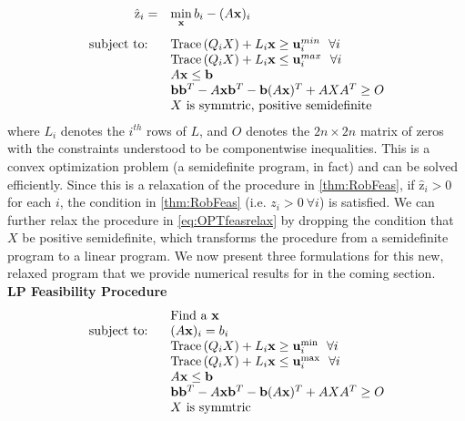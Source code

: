 \begin{equation}\label{eq:OPTfeasrelax}
  \begin{array}{rl}
    \hat{\mathrm{z}}_{i} = & \min\limits_{\vx}  b_i-(A\vx)_i  \\
    \vspace*{-0.05in} \\
    \text{subject to: } \ & \Tr\left(Q_iX\right)+ L_i\vx \geq \vu_i^{min} \ \ \forall i\\
    & \Tr\left(Q_iX\right)+ L_i\vx \leq \vu_i^{max} \ \ \forall i\\
    &A\vx\leq \vb \\
    &\vb\vb^T-A\vx\vb^T-\vb(A\vx)^T+AXA^T\geq O \\
    &X \text{ is symmtric, positive semidefinite}
  \end{array}
\end{equation}
%
where $L_i$ denotes the $i^{th}$ rows of $L$, and $O$ denotes the $2n \times 2n$ matrix of zeros with the constraints understood to be componentwise inequalities. 
This is a convex optimization problem (a semidefinite program, in fact) and can be solved efficiently. 
Since this is a relaxation of the procedure in \cref{thm:RobFeas}, if $\hat{\mathrm{z}}_i>0$ for each $i$, the condition in \cref{thm:RobFeas} (i.e. $z_i>0 \ \forall i$) is satisfied. 
We can further relax the procedure in \cref{eq:OPTfeasrelax} by dropping the condition that $X$ be positive semidefinite, which transforms the procedure from a semidefinite program to a linear program. 
We now present three formulations for this new, relaxed program that we provide numerical results for in the coming section.\\

\textbf{LP Feasibility Procedure} 
\begin{equation} \label{eq:OPTfeasrelaxLP1}
\begin{array}{rl}
 &\text{Find a }\mathbf{x} \\
 \text{subject to: } \ &(A\mathbf{x})_i= b_i \\
 &\operatorname{Trace}\left(Q_iX\right)+ L_i\mathbf{x} \geq \mathbf{u}_i^{\min}  \ \ \forall i\\
 & \operatorname{Trace}\left(Q_iX\right)+ L_i\mathbf{x} \leq \mathbf{u}_i^{\max}  \ \ \forall i\\
 	&A\mathbf{x}\leq \mathbf{b} \\
 	&\mathbf{b}\mathbf{b}^T-A\mathbf{x}\mathbf{b}^T-\mathbf{b}(A\mathbf{x})^T+AXA^T\geq O \\
 	&X \text{ is symmtric}
\end{array}
\end{equation}


